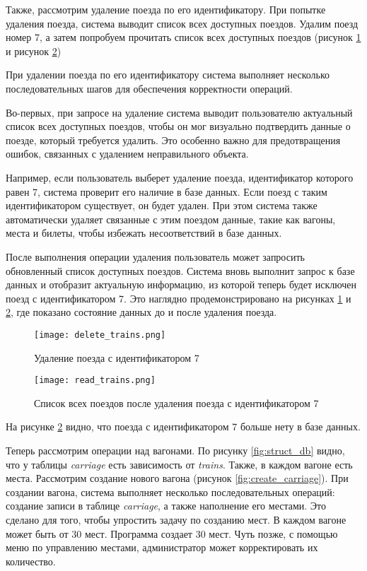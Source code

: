 Также, рассмотрим удаление поезда по его идентификатору. При попытке удаления поезда, система выводит список всех доступных поездов. Удалим поезд номер 7, а затем попробуем прочитать список всех доступных поездов (рисунок \ref{fig:delete_trains} и рисунок \ref{fig:read_trains})


При удалении поезда по его идентификатору система выполняет несколько последовательных шагов для обеспечения корректности операций.

Во-первых, при запросе на удаление система выводит пользователю актуальный список всех доступных поездов, чтобы он мог визуально подтвердить данные о поезде, который требуется удалить. Это особенно важно для предотвращения ошибок, связанных с удалением неправильного объекта.

Например, если пользователь выберет удаление поезда, идентификатор которого равен 7, система проверит его наличие в базе данных. Если поезд с таким идентификатором существует, он будет удален. При этом система также автоматически удаляет связанные с этим поездом данные, такие как вагоны, места и билеты, чтобы избежать несоответствий в базе данных.

После выполнения операции удаления пользователь может запросить обновленный список доступных поездов. Система вновь выполнит запрос к базе данных и отобразит актуальную информацию, из которой теперь будет исключен поезд с идентификатором 7. Это наглядно продемонстрировано на рисунках \ref{fig:delete_trains} и \ref{fig:read_trains}, где показано состояние данных до и после удаления поезда.

\begin{figure}[h]
    \centering
    \texttt{[image: delete\_trains.png]}
    \caption{Удаление поезда с идентификатором 7}
    \label{fig:delete_trains}
\end{figure}

\begin{figure}[h]
    \centering
    \texttt{[image: read\_trains.png]}
    \caption{Список всех поездов после удаления поезда с идентификатором 7}
    \label{fig:read_trains}
\end{figure}

На рисунке \ref{fig:read_trains} видно, что поезда с идентификатором 7 больше нету в базе данных.

Теперь рассмотрим операции над вагонами. По рисунку \ref{fig:struct_db} видно, что у таблицы \textit{carriage} есть зависимость от \textit{trains}. Также, в каждом вагоне есть места. Рассмотрим создание нового вагона (рисунок \ref{fig:create_carriage}). При создании вагона, система выполняет несколько последовательных операций: создание записи в таблице \textit{carriage}, а также наполнение его местами. Это сделано для того, чтобы упростить задачу по созданию мест. В каждом вагоне может быть от 30 мест. Программа создает 30 мест. Чуть позже, с помощью меню по управлению местами, администратор может корректировать их количество.

